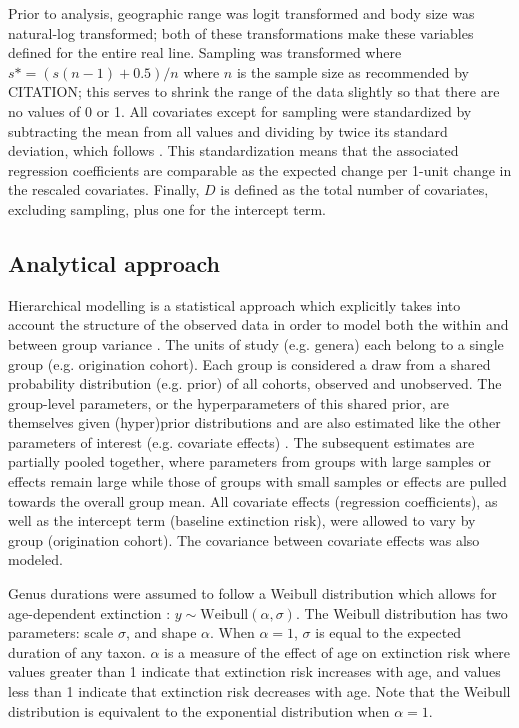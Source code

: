 \documentclass{article}
\begin{document}
Prior to analysis, geographic range was logit transformed and body size was natural-log transformed; both of these transformations make these variables defined for the entire real line. Sampling was transformed where \(s* = (s (n - 1) + 0.5) / n\) where \(n\) is the sample size as recommended by CITATION; this serves to shrink the range of the data slightly so that there are no values of 0 or 1. All covariates except for sampling were standardized by subtracting the mean from all values and dividing by twice its standard deviation, which follows \citet{Gelman2007}. This standardization means that the associated regression coefficients are comparable as the expected change per 1-unit change in the rescaled covariates. Finally, \(D\) is defined as the total number of covariates, excluding sampling, plus one for the intercept term.



\subsection{Analytical approach}

Hierarchical modelling is a statistical approach which explicitly takes into account the structure of the observed data in order to model both the within and between group variance \citep{Gelman2013d,Gelman2007}. The units of study (e.g. genera) each belong to a single group (e.g. origination cohort). Each group is considered a draw from a shared probability distribution (e.g. prior) of all cohorts, observed and unobserved. The group-level parameters, or the hyperparameters of this shared prior, are themselves given (hyper)prior distributions and are also estimated like the other parameters of interest (e.g. covariate effects) \citep{Gelman2013d}. The subsequent estimates are partially pooled together, where parameters from groups with large samples or effects remain large while those of groups with small samples or effects are pulled towards the overall group mean. All covariate effects (regression coefficients), as well as the intercept term (baseline extinction risk), were allowed to vary by group (origination cohort). The covariance between covariate effects was also modeled. 

Genus durations were assumed to follow a Weibull distribution which allows for age-dependent extinction \citep{Klein2003}: \(y \sim \mathrm{Weibull}(\alpha, \sigma)\). The Weibull distribution has two parameters: scale \(\sigma\), and shape \(\alpha\). When \(\alpha = 1\), \(\sigma\) is equal to the expected duration of any taxon. \(\alpha\) is a measure of the effect of age on extinction risk where values greater than 1 indicate that extinction risk increases with age, and values less than 1 indicate that extinction risk decreases with age. Note that the Weibull distribution is equivalent to the exponential distribution when \(\alpha = 1\). 
\end{document}
